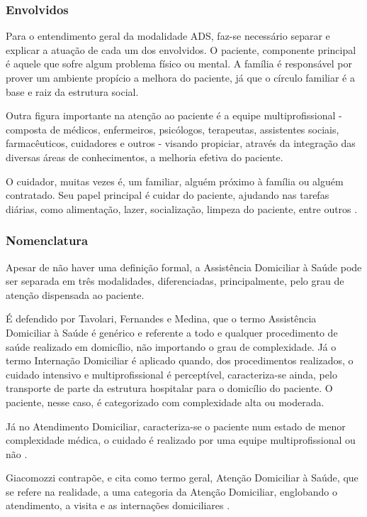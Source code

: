 \subsubsection{Envolvidos}\label{subsubsec:envolvidos}

Para o entendimento geral da modalidade ADS, faz-se necessário separar e
explicar a atuação de cada um dos envolvidos. O paciente, componente principal
é aquele que sofre algum problema físico ou mental. A família é responsável
por prover um ambiente propício a melhora do paciente, já que o círculo familiar
é a base e raiz da estrutura social.

Outra figura importante na atenção ao paciente é a equipe multiprofissional -
composta de médicos, enfermeiros, psicólogos, terapeutas, assistentes sociais,
farmacêuticos, cuidadores e outros - visando propiciar, através da integração
das diversas áreas de conhecimentos, a melhoria efetiva do paciente.

O cuidador, muitas vezes é, um familiar, alguém próximo à família ou alguém
contratado. Seu papel principal é cuidar do paciente, ajudando nas tarefas
diárias, como alimentação, lazer, socialização, limpeza do paciente, entre
outros \cite{amaral2001assistencia}.


\subsubsection{Nomenclatura}\label{subsubsec:nomenclatura}

Apesar de não haver uma definição formal, a Assistência Domiciliar à Saúde pode
ser separada em três modalidades, diferenciadas, principalmente, pelo grau de 
atenção dispensada ao paciente. 

É defendido por Tavolari, Fernandes e Medina, que o termo Assistência Domiciliar
à Saúde é genérico e referente a todo e qualquer procedimento de saúde realizado
em domicílio, não importando o grau de complexidade. Já o termo Internação
Domiciliar é aplicado quando, dos procedimentos realizados, o cuidado intensivo
e multiprofissional é perceptível, caracteriza-se ainda, pelo transporte de
parte da estrutura hospitalar para o domicílio do paciente. O paciente, nesse
caso, é categorizado com complexidade alta ou moderada.

Já no Atendimento Domiciliar, caracteriza-se o paciente num estado de menor 
complexidade médica, o cuidado é realizado por uma equipe multiprofissional ou
não \cite{tavolari2000desenvolvimento}.  

Giacomozzi contrapõe, e cita como termo geral, Atenção Domiciliar à Saúde, 
que se refere na realidade, a uma categoria da Atenção Domiciliar, englobando
o atendimento, a visita e as internações domiciliares \cite{giacomozzi2006pratica}.

